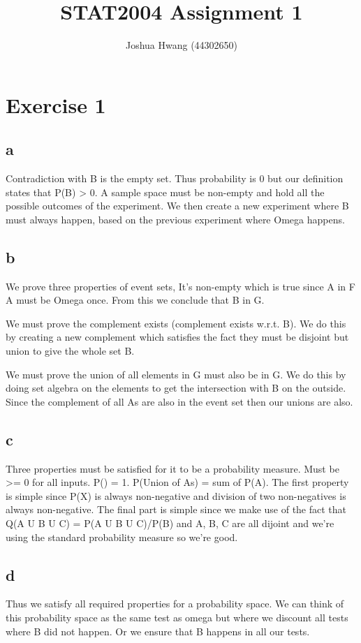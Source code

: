 \documentclass{article}
\title{STAT2004 Assignment 1}
\author{Joshua Hwang (44302650)}
\begin{document}
\section{Exercise 1}
\subsection{a}
Contradiction with B is the empty set. Thus probability is 0 but our definition
states that P(B) > 0.
A sample space must be non-empty and hold all the possible outcomes of the
experiment. We then create a new experiment where B must always happen, based
on the previous experiment where Omega happens.

\subsection{b}
We prove three properties of event sets,
It's non-empty which is true since A in F A must be Omega once. From this
we conclude that B in G.

We must prove the complement exists (complement exists w.r.t. B). We do this
by creating a new complement which satisfies the fact they must be disjoint
but union to give the whole set B.

We must prove the union of all elements in G must also be in G. We do this
by doing set algebra on the elements to get the intersection with B on the
outside. Since the complement of all As are also in the event set then
our unions are also.

\subsection{c}
Three properties must be satisfied for it to be a probability measure.
Must be >= 0 for all inputs. P(\Omega) = 1. P(Union of As) = sum of
P(A).
The first property is simple since P(X) is always non-negative and division
of two non-negatives is always non-negative.
The final part is simple since we make use of the fact that Q(A U B U C)
= P(A U B U C)/P(B) and A, B, C are all dijoint and we're using the standard
probability measure so we're good.

\subsection{d}
Thus we satisfy all required properties for a probability space.
We can think of this probability space as the same test as omega but where
we discount all tests where B did not happen. Or we ensure that B happens
in all our tests.
\end{document}
